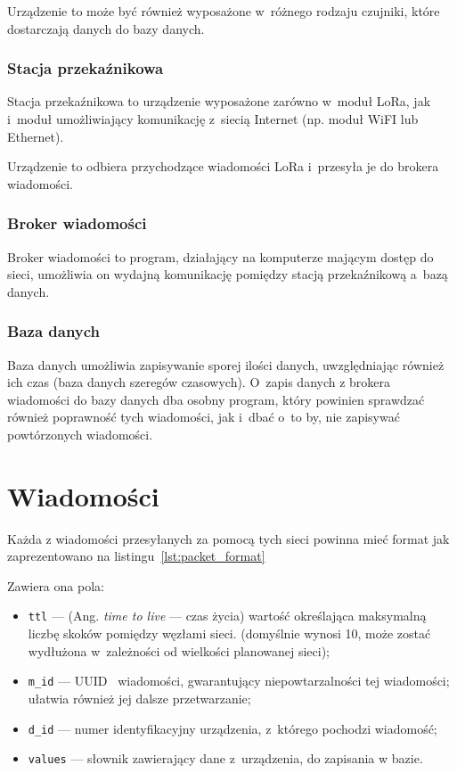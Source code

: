 Urządzenie to może być również wyposażone w~różnego rodzaju czujniki, które dostarczają danych do bazy danych.

\subsubsection{Stacja przekaźnikowa}
Stacja przekaźnikowa to urządzenie wyposażone zarówno w~moduł LoRa, jak i~moduł umożliwiający komunikację z~siecią Internet (np. moduł WiFI lub Ethernet).

Urządzenie to odbiera przychodzące wiadomości LoRa i~przesyła je do brokera wiadomości.

\subsubsection{Broker wiadomości}
Broker wiadomości to program, działający na komputerze mającym dostęp do sieci, umożliwia on wydajną komunikację pomiędzy stacją przekaźnikową a~bazą danych.

\subsubsection{Baza danych}
Baza danych umożliwia zapisywanie sporej ilości danych, uwzględniając również ich czas (baza danych szeregów czasowych).
O~zapis danych z brokera wiadomości do bazy danych dba osobny program, który powinien sprawdzać również poprawność tych wiadomości, jak i~dbać o~to by, nie zapisywać powtórzonych wiadomości.

\section{Wiadomości}
Każda z wiadomości przesyłanych za pomocą tych sieci powinna mieć format jak zaprezentowano na listingu~\ref{lst:packet_format}

Zawiera ona pola:
\begin{itemize}
    \item \texttt{ttl} — (Ang. \emph{time to live} — czas życia) wartość określająca maksymalną liczbę skoków pomiędzy węzłami sieci. (domyślnie wynosi 10, może zostać wydłużona w~zależności od wielkości planowanej sieci);
    \item \texttt{m\_id} — UUID~\cite{RFC:uuid} wiadomości, gwarantujący niepowtarzalności tej wiadomości; ułatwia również jej dalsze przetwarzanie;
    \item \texttt{d\_id} — numer identyfikacyjny urządzenia, z~którego pochodzi wiadomość;
    \item \texttt{values} — słownik zawierający dane z~urządzenia, do zapisania w bazie.
\end{itemize}


